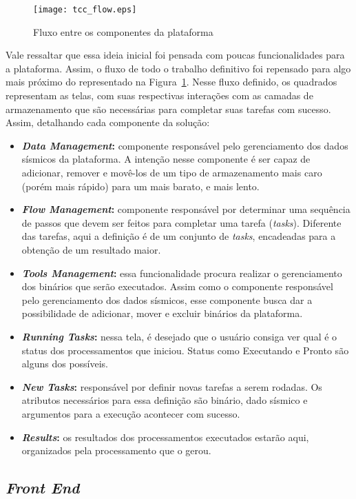 \documentclass[11pt,twoside]{article}
\begin{document}
\begin{figure}[!h]
  \centering
  \texttt{[image: tcc\_flow.eps]}
  \caption{Fluxo entre os componentes da plataforma}
  \label{fig:flowScreen}
\end{figure}

Vale ressaltar que essa ideia inicial foi pensada com poucas funcionalidades para a plataforma. Assim, o fluxo de todo o trabalho definitivo foi 
repensado para algo mais próximo do representado na Figura~\ref{fig:flowScreen}. Nesse fluxo definido, os quadrados representam as telas, com suas respectivas interações com 
as camadas de armazenamento que são necessárias para completar suas tarefas com sucesso. Assim, detalhando cada componente da solução:

\begin{itemize}
  \item \textbf{\emph{Data Management}:} componente responsável pelo gerenciamento dos dados sísmicos da plataforma. A intenção nesse componente é ser capaz de adicionar, remover e 
  movê-los de um tipo de armazenamento mais caro (porém mais rápido) para um mais barato, e mais lento. 
  \item \textbf{\emph{Flow Management}:} componente responsável por determinar uma sequência de passos que devem ser feitos para completar uma tarefa (\emph{tasks}). Diferente das tarefas,
  aqui a definição é de um conjunto de \emph{tasks}, encadeadas para a obtenção de um resultado maior.
  \item \textbf{\emph{Tools Management}:} essa funcionalidade procura realizar o gerenciamento dos binários que serão executados. Assim como o componente responsável pelo gerenciamento
  dos dados sísmicos, esse componente busca dar a possibilidade de adicionar, mover e excluir binários da plataforma.
  \item \textbf{\emph{Running Tasks}:} nessa tela, é desejado que o usuário consiga ver qual é o status dos processamentos que iniciou. Status como Executando e Pronto são alguns dos 
  possíveis.
  \item \textbf{\emph{New Tasks}:} responsável por definir novas tarefas a serem rodadas. Os atributos necessários para essa definição são binário, dado sísmico 
  e argumentos para a execução acontecer com sucesso. 
  \item \textbf{\emph{Results}:} os resultados dos processamentos executados estarão aqui, organizados pela processamento que o gerou.
\end{itemize}

\subsection{\emph{Front End}}
\end{document}
